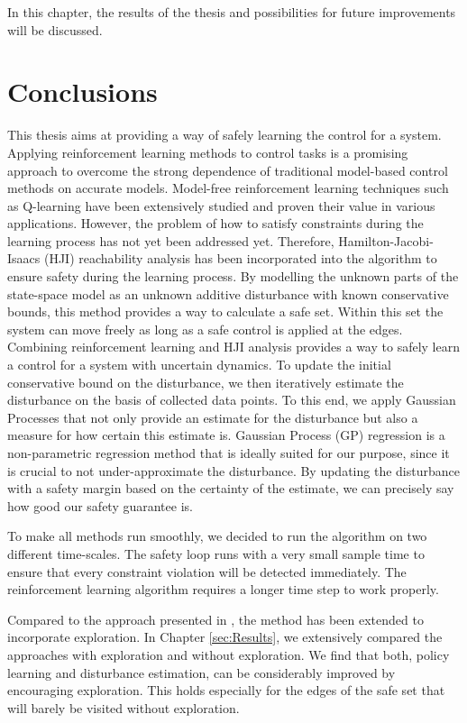 \documentclass[../main.tex]{subfiles}
\begin{document}
In this chapter, the results of the thesis and possibilities for future improvements will be discussed. 
\section{Conclusions}
This thesis aims at providing a way of safely learning the control for a system. Applying reinforcement learning methods to control tasks is a promising approach to overcome the strong dependence of traditional model-based control methods on accurate models. Model-free reinforcement learning techniques such as Q-learning have been extensively studied and proven their value in various applications. However, the problem of how to satisfy constraints during the learning process has not yet been addressed yet. Therefore, Hamilton-Jacobi-Isaacs (HJI) reachability analysis has been incorporated into the algorithm to ensure safety during the learning process. By modelling the unknown parts of the state-space model as an unknown additive disturbance with known conservative bounds, this method provides a way to calculate a safe set. Within this set the system can move freely as long as a safe control is applied at the edges. Combining reinforcement learning and HJI analysis provides a way to safely learn a control for a system with uncertain dynamics. To update the initial conservative bound on the disturbance, we then iteratively estimate the disturbance on the basis of collected data points. To this end, we apply Gaussian Processes that not only provide an estimate for the disturbance but also a measure for how certain this estimate is. Gaussian Process (GP) regression is a non-parametric regression method that is ideally suited for our purpose, since it is crucial to not under-approximate the disturbance. By updating the disturbance with a safety margin based on the certainty of the estimate, we can precisely say how good our safety guarantee is.\par
To make all methods run smoothly, we decided to run the algorithm on two different time-scales. The safety loop runs with a very small sample time to ensure that every constraint violation will be detected immediately. The reinforcement learning algorithm requires a longer time step to work properly.\par

Compared to the approach presented in \cite{akametalu2014reachability}, the method has been extended to incorporate exploration. In Chapter \ref{sec:Results}, we extensively compared the approaches with exploration and without exploration. We find that both, policy learning and disturbance estimation, can be considerably improved by encouraging exploration. This holds especially for the edges of the safe set that will barely be visited without exploration. 
\end{document}

